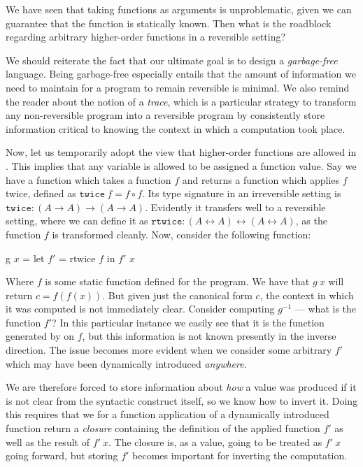 We have seen that taking functions as arguments is unproblematic, given we can
guarantee that the function is statically known. Then what is the roadblock
regarding arbitrary higher-order functions in a reversible setting?

We should reiterate the fact that our ultimate goal is to design a
\emph{garbage-free} language. Being garbage-free especially entails that the
amount of information we need to maintain for a program to remain reversible is
minimal. We also remind the reader about the notion of a \emph{trace}, which is
a particular strategy to transform any non-reversible program into a reversible
program by consistently store information critical to knowing the context in
which a computation took place.

Now, let us temporarily adopt the view that higher-order functions are allowed
in \rfunc. This implies that any variable is allowed to be assigned a function
value. Say we have a function  which takes a function $f$ and
returns a function which applies $f$ twice, defined as $\texttt{twice}~f = f
\circ f$. Its type signature in an irreversible setting is $\texttt{twice}: (A
\rightarrow A) \rightarrow (A \rightarrow A)$. Evidently it transfers well to a
reversible setting, where we can define it as $\texttt{rtwice}: (A
\leftrightarrow A) \leftrightarrow (A \leftrightarrow A)$, as the function $f$
is transformed cleanly. Now, consider the following function:

\begin{rfuncode}
  g $x$ = let $f'$ = rtwice $f$
          in $f'$ $x$
\end{rfuncode}

Where $f$ is some static function defined for the program. We have that $g~x$
will return $c = f(f(x))$. But given just the canonical form $c$, the context
in which it was computed is not immediately clear. Consider computing $g^{-1}$
--- what is the function $f'$? In this particular instance we easily see that
it is the function generated by  on $f$, but this information is
not known presently in the inverse direction. The issue becomes more evident
when we consider some arbitrary $f'$ which may have been dynamically introduced
\emph{anywhere}.

We are therefore forced to store information about \emph{how} a value was
produced if it is not clear from the syntactic construct itself, so we know how
to invert it. Doing this requires that we for a function application of a
dynamically introduced function return a \emph{closure} containing the
definition of the applied function $f'$ as well as the result of $f'~x$. The
closure is, as a value, going to be treated as $f'~x$ going forward, but
storing $f'$ becomes important for inverting the computation.

